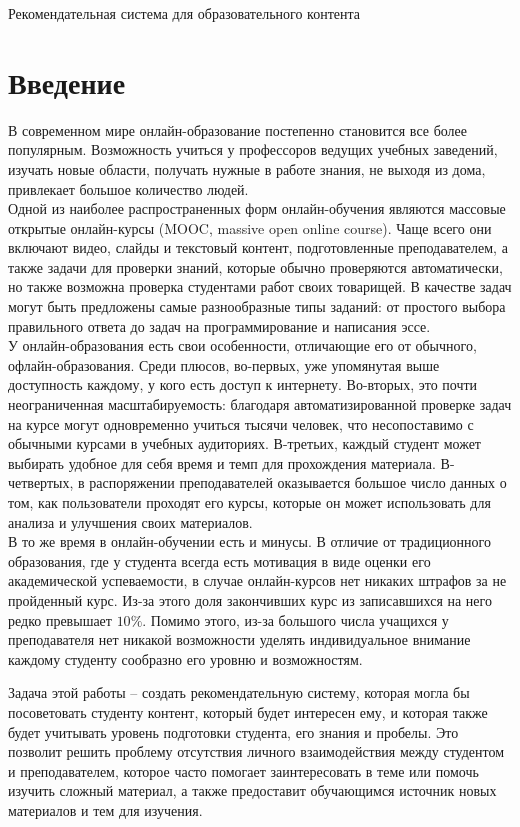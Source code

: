 \documentclass[12pt]{article}
\begin{document}
\begin{center}\Huge
Рекомендательная система для образовательного контента
\end{center}

\section{Введение}
В современном мире онлайн-образование постепенно становится все более популярным. Возможность учиться у профессоров ведущих учебных заведений, изучать новые области, получать нужные в работе знания, не выходя из дома, привлекает большое количество людей. 
\\\indent Одной из наиболее распространенных форм онлайн-обучения являются массовые открытые онлайн-курсы (MOOC, massive open online course). Чаще всего они включают видео, слайды и текстовый контент, подготовленные преподавателем, а также задачи для проверки знаний, которые обычно проверяются автоматически, но также возможна проверка студентами работ своих товарищей. В качестве задач могут быть предложены самые разнообразные типы заданий: от простого выбора правильного ответа до задач на программирование и написания эссе.
\\\indent У онлайн-образования есть свои особенности, отличающие его от обычного, офлайн-образования. Среди плюсов, во-первых, уже упомянутая выше доступность каждому, у кого есть доступ к интернету. Во-вторых, это почти неограниченная масштабируемость: благодаря автоматизированной проверке задач на курсе могут одновременно учиться тысячи человек, что несопоставимо с обычными курсами в учебных аудиториях. В-третьих, каждый студент может выбирать удобное для себя время и темп для прохождения материала. В-четвертых, в распоряжении преподавателей оказывается большое число данных о том, как пользователи проходят его курсы, которые он может использовать для анализа и улучшения своих материалов.
\\\indent В то же время в онлайн-обучении есть и минусы. В отличие от традиционного образования, где у студента всегда есть мотивация в виде оценки его академической успеваемости, в случае онлайн-курсов нет никаких штрафов за не пройденный курс. Из-за этого доля закончивших курс из записавшихся на него редко превышает $10\%$. Помимо этого, из-за большого числа учащихся у преподавателя нет никакой возможности уделять индивидуальное внимание каждому студенту сообразно его уровню и возможностям.

\indent Задача этой работы -- создать рекомендательную систему, которая могла бы посоветовать студенту контент, который будет интересен ему, и которая также будет учитывать уровень подготовки студента, его знания и пробелы. Это позволит решить проблему отсутствия личного взаимодействия между студентом и преподавателем, которое часто помогает заинтересовать в теме или помочь изучить сложный материал, а также предоставит обучающимся источник новых материалов и тем для изучения.
\end{document}
